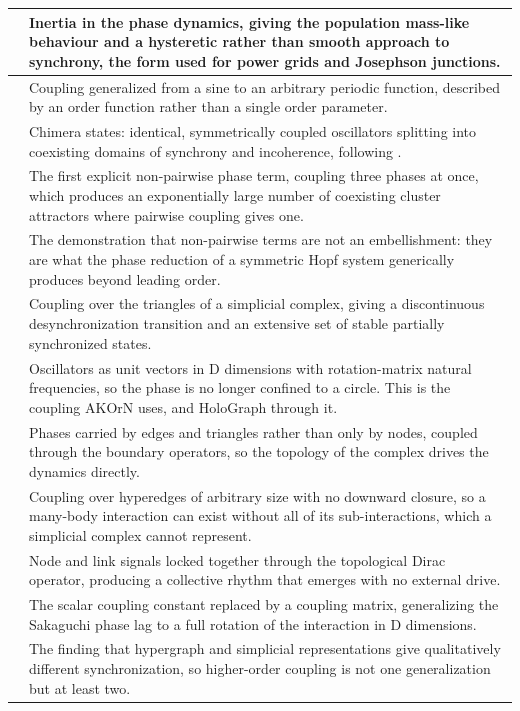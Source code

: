 \documentclass[10pt]{article}
\begin{document}
\begin{longtable}[]{@{}
  >{\raggedright\arraybackslash}p{}
  >{\raggedright\arraybackslash}p{}@{}}
\cmidrule{1-2}\citet{ermentrout1991} & Inertia in the phase dynamics,
giving the population mass-like behaviour and a hysteretic rather than
smooth approach to synchrony, the form used for power grids and
Josephson junctions. \\
\cmidrule{1-2}\citet{daido1992} & Coupling generalized from a sine to an
arbitrary periodic function, described by an order function rather than
a single order parameter. \\
\cmidrule{1-2}\citet{abrams2004} & Chimera states: identical,
symmetrically coupled oscillators splitting into coexisting domains of
synchrony and incoherence, following \citet{kuramoto2002}. \\
\cmidrule{1-2}\citet{tanaka2011} & The first explicit non-pairwise phase
term, coupling three phases at once, which produces an exponentially
large number of coexisting cluster attractors where pairwise coupling
gives one. \\
\cmidrule{1-2}\citet{ashwin2016} & The demonstration that non-pairwise
terms are not an embellishment: they are what the phase reduction of a
symmetric Hopf system generically produces beyond leading order. \\
\cmidrule{1-2}\citet{skardal2019} & Coupling over the triangles of a
simplicial complex, giving a discontinuous desynchronization transition
and an extensive set of stable partially synchronized states. \\
\cmidrule{1-2}\citet{chandra2019} & Oscillators as unit vectors in D
dimensions with rotation-matrix natural frequencies, so the phase is no
longer confined to a circle. This is the coupling AKOrN uses, and
HoloGraph through it. \\
\cmidrule{1-2}\citet{millan2020} & Phases carried by edges and triangles
rather than only by nodes, coupled through the boundary operators, so
the topology of the complex drives the dynamics directly. \\
\cmidrule{1-2}\citet{mulas2020} & Coupling over hyperedges of arbitrary
size with no downward closure, so a many-body interaction can exist
without all of its sub-interactions, which a simplicial complex cannot
represent. \\
\cmidrule{1-2}\citet{calmon2022} & Node and link signals locked together
through the topological Dirac operator, producing a collective rhythm
that emerges with no external drive. \\
\cmidrule{1-2}\citet{de-aguiar2023} & The scalar coupling constant
replaced by a coupling matrix, generalizing the Sakaguchi phase lag to a
full rotation of the interaction in D dimensions. \\
\cmidrule{1-2}\citet{zhang2023} & The finding that hypergraph and
simplicial representations give qualitatively different synchronization,
so higher-order coupling is not one generalization but at least two. \\
\end{longtable}
\end{document}

